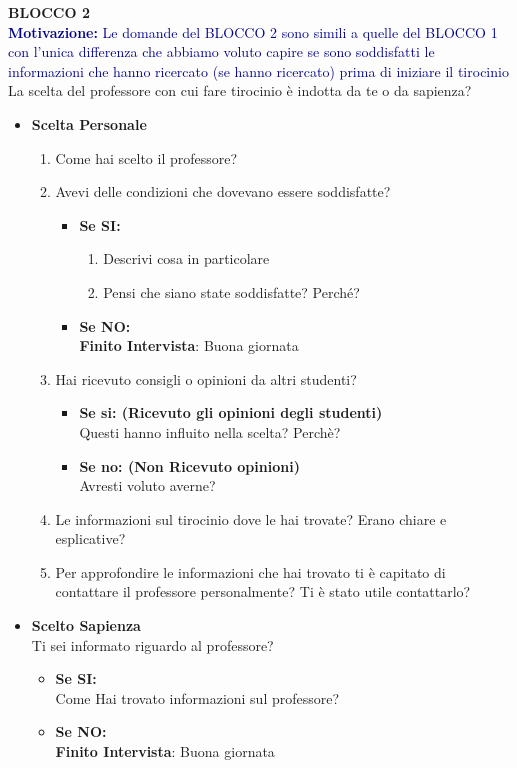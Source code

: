 \textbf{BLOCCO 2}\\
\textcolor{darkblue}{\textbf{Motivazione:} Le domande del BLOCCO 2 sono simili a quelle del BLOCCO 1
con l'unica differenza che abbiamo voluto capire se sono soddisfatti le informazioni che hanno ricercato (se hanno ricercato) prima di iniziare il tirocinio}\\
La scelta del professore con cui fare tirocinio è indotta da te o da sapienza?
\begin{itemize}
    \item \textbf{Scelta Personale}
    \begin{enumerate}
        \item Come hai scelto il professore?
        \item Avevi delle condizioni che dovevano essere soddisfatte?
        \begin{itemize}
            \item \textbf{Se SI:}
            \begin{enumerate}
                \item Descrivi cosa in particolare
                \item Pensi che siano state soddisfatte? Perché?
            \end{enumerate}
            \item \textbf{Se NO:}\\
            \textbf{Finito Intervista}: Buona giornata
        \end{itemize}
        \item Hai ricevuto consigli o opinioni da altri studenti?
        \begin{itemize}
            \item \textbf{Se si: (Ricevuto gli opinioni degli studenti)}\\
            Questi hanno influito nella scelta? Perchè?
            \item \textbf{Se no: (Non Ricevuto opinioni)}\\
            Avresti voluto averne?
        \end{itemize}
        \item Le informazioni sul tirocinio dove le hai trovate? Erano chiare e esplicative?
        \item Per approfondire le informazioni che hai trovato ti è capitato di contattare il  professore personalmente? Ti è stato utile contattarlo?
    \end{enumerate}

    \item \textbf{Scelto Sapienza}\\
    Ti sei informato riguardo al professore?
    \begin{itemize}
        \item \textbf{Se SI:}\\
        Come Hai trovato informazioni sul professore?
        \item \textbf{Se NO:}\\
        \textbf{Finito Intervista}: Buona giornata
    \end{itemize}
\end{itemize}

